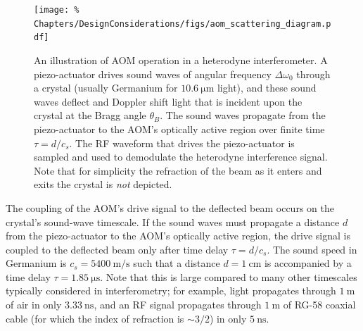 \begin{figure}
  \centering
  \texttt{[image: \%
    Chapters/DesignConsiderations/figs/aom\_scattering\_diagram.pdf]}
  \caption[Illustration of AOM operation in a heterodyne interferometer]{%
    An illustration of AOM operation in a heterodyne interferometer.
    A piezo-actuator drives sound waves of angular frequency $\Delta \omega_0$
    through a crystal (usually Germanium for $\SI{10.6}{\micro\meter}$ light),
    and these sound waves deflect and Doppler shift light
    that is incident upon the crystal at the Bragg angle $\theta_B$.
    The sound waves propagate from the piezo-actuator
    to the AOM's optically active region
    over finite time $\tau = d / c_s$.
    The RF waveform that drives the piezo-actuator
    is sampled and used to demodulate the heterodyne interference signal.
    Note that for simplicity the refraction of the beam
    as it enters and exits the crystal is \emph{not} depicted.}
\label{fig:DesignConsiderations:aom_scattering_diagram}
\end{figure}

The coupling of the AOM's drive signal to the deflected beam
occurs on the crystal's sound-wave timescale.
If the sound waves must propagate a distance $d$
from the piezo-actuator to the AOM's optically active region,
the drive signal is coupled to the deflected beam
only after time delay $\tau = d / c_s$.
\graffito{\textcolor{red}{reference?}}
The sound speed in Germanium is $c_s = \SI{5400}{\meter\per\second}$
such that a distance $d = \SI{1}{\centi\meter}$
is accompanied by a time delay $\tau = \SI{1.85}{\micro\second}$.
Note that this is large compared to many other timescales
typically considered in interferometry;
for example, light propagates
through $\SI{1}{\meter}$ of air
in only $\SI{3.33}{\nano\second}$,
and an RF signal propagates
through $\SI{1}{\meter}$ of RG-58 coaxial cable
(for which the index of refraction is $\sim 3 / 2$)
in only $\SI{5}{\nano\second}$.

